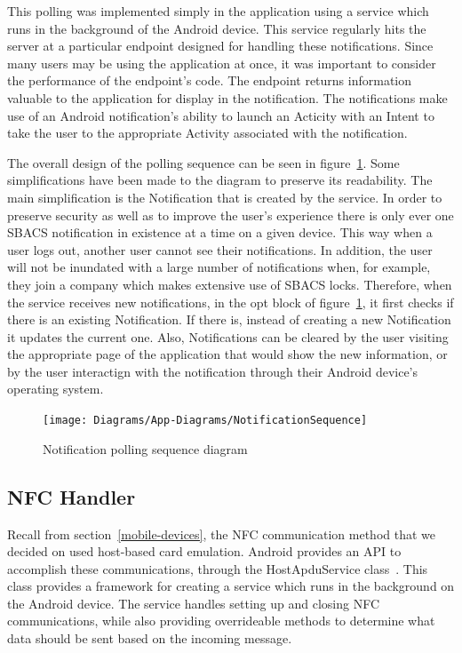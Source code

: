 \documentclass[12pt]{report}
\let\Oldsubsection\subsection
\renewcommand{\subsection}{\FloatBarrier\Oldsubsection}
\begin{document}
This polling was implemented simply in the application using a service which runs in the background of the Android
device. This service regularly hits the server at a particular endpoint designed for handling these notifications. Since
many users may be using the application at once, it was important to consider the performance of the endpoint's code.
The endpoint returns information valuable to the application for display in the notification. The notifications make use
of an Android notification's ability to launch an Acticity with an Intent to take the user to the appropriate Activity
associated with the notification.

The overall design of the polling sequence can be seen in figure~\ref{fig:notfication-sequence}. Some simplifications
have been made to the diagram to preserve its readability. The main simplification is the Notification that is created
by the service. In order to preserve security as well as to improve the user's experience there is only ever one SBACS
notification in existence at a time on a given device. This way when a user logs out, another user cannot see their
notifications. In addition, the user will not be inundated with a large number of notifications when, for example, they
join a company which makes extensive use of SBACS locks. Therefore, when the service receives new notifications, in the
opt block of figure~\ref{fig:notfication-sequence}, it first checks if there is an existing Notification. If there is,
instead of creating a new Notification it updates the current one. Also, Notifications can be cleared by the user
visiting the appropriate page of the application that would show the new information, or by the user interactign with
the notification through their Android device's operating system.

\begin{figure}
    \centering
    \texttt{[image: Diagrams/App-Diagrams/NotificationSequence]}
    \caption{Notification polling sequence diagram}
    \label{fig:notfication-sequence}
\end{figure}


\subsection{NFC Handler} \label{nfc-handler}

Recall from section~\ref{mobile-devices}, the NFC communication method that we decided on used host-based card emulation. Android provides
an API to accomplish these communications, through the HostApduService class~\autocite{ANDROIDAPDU}. This class provides a framework for
creating a service which runs in the background on the Android device. The service handles setting up and closing NFC
communications, while also providing overrideable methods to determine what data should be sent based on the incoming
message.
\end{document}
